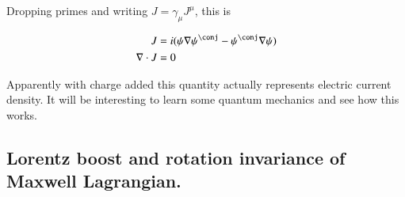 \documentclass{article}
\begin{document}
Dropping primes and writing $J = \gamma_\mu J^\mu$, this is

\begin{align*}
J &= i (\psi \grad {\psi}^\conj - \psi^\conj \grad {\psi} ) \\
\grad \cdot J &= 0
\end{align*}

Apparently with charge added this quantity actually represents electric current density.  It will be interesting to
learn some quantum mechanics and see how this works.

\subsection{ Lorentz boost and rotation invariance of Maxwell Lagrangian. }

% 
%
%

\end{document}
